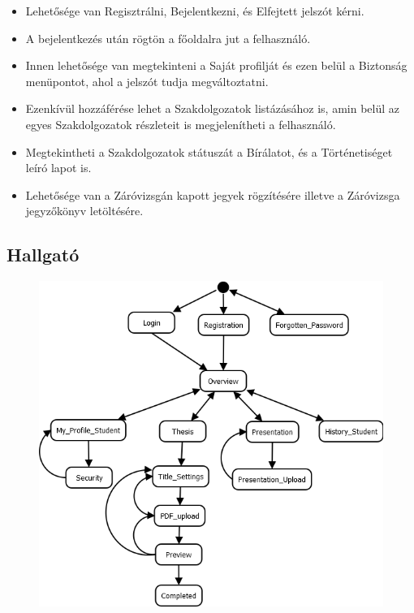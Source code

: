 \documentclass[a4paper,12pt]{article}
\begin{document}
\begin{itemize}
	\item Lehetősége van Regisztrálni, Bejelentkezni, és Elfejtett jelszót kérni. 
	\item A bejelentkezés után rögtön a főoldalra jut a felhasználó. 
	\item Innen lehetősége van megtekinteni a Saját profilját és ezen belül a Biztonság menüpontot, ahol a jelszót tudja megváltoztatni. 
	\item Ezenkívül hozzáférése lehet a Szakdolgozatok listázásához is, amin belül az egyes Szakdolgozatok részleteit is megjelenítheti a felhasználó. 
	\item Megtekintheti a Szakdolgozatok státuszát a Bírálatot, és a Történetiséget leíró lapot is. 
	\item Lehetősége van a Záróvizsgán kapott jegyek rögzítésére illetve a Záróvizsga jegyzőkönyv letöltésére. 
\end{itemize}

\subsection{Hallgató}

\begin{figure}
	\centering
	\includegraphics[width=\textwidth]{images/Lapok_kozotti_atmenetek/Hallgato.png}
	\caption{}
	\label{fig:Hallgato}
\end{figure}
\end{document}
